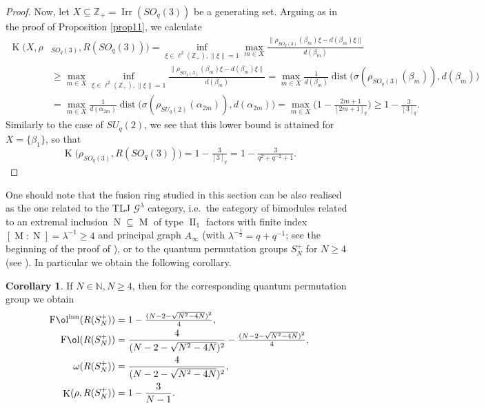 \documentclass[11 pt, leqno]{amsart}
\newcommand{\mc}{\mathcal}
\newcommand{\NN}{\mathbb{N}}
\newcommand{\ZZ}{\mathbb{Z}}
\newcommand{\oon}{\operatorname}
\DeclareMathOperator{\Fol}{F\mathrm{\o}l}
\DeclareMathOperator{\Folinn}{F\mathrm{\o}l^{inn}}
\DeclareMathOperator{\Kaz}{K}
\DeclareMathOperator{\Irr}{Irr}
\DeclareMathOperator{\M}{M}
\DeclareMathOperator{\N}{N}
\theoremstyle{definition}
\newtheorem{corollary}[theorem]{Corollary}
\numberwithin{equation}{section}
\begin{document}
\begin{proof}
Now, let $X\subseteq \ZZ_+=\Irr(SO_q(3))$ be a generating set. Arguing as in the proof of Proposition \ref{prop11}, we calculate
\begin{align*}
\Kaz\bigl(X,\rho&_{SO_q(3)},R(SO_q(3))\bigr)=
\inf_{\xi\in \ell^2(\ZZ_+), \|\xi\|=1}
\max_{m\in X} \tfrac{ \|\rho_{SO_q(3)}(\beta_m) \xi-d(\beta_m)\xi\|}{d(\beta_m)}\\
&\ge 
\max_{m\in X}\inf_{\xi\in \ell^2(\ZZ_+), \|\xi\|=1}\tfrac{ \|\rho_{SO_q(3)}(\beta_m) \xi-d(\beta_m)\xi\|}{d(\beta_m)}=
\max_{m\in X}\tfrac{1}{d(\beta_m)}
\oon{dist}\bigl( \sigma ( \rho_{SO_q(3)}(\beta_m) ), 
d(\beta_m)\bigr)\\
&=
\max_{m\in X}\tfrac{1}{d(\alpha_{2m})}
\oon{dist}\bigl( \sigma ( \rho_{SU_q(2)}(\alpha_{2m}) ), 
d(\alpha_{2m})\bigr)=
\max_{m\in X}
\bigl(1- \tfrac{2m+1}{[2m+1]_q}\bigr) \ge 1-\tfrac{3}{[3]_q}.
\end{align*}
Similarly to the case of $SU_q(2)$, we see that this lower bound is attained for $X=\{\beta_1\}$, so that
\[
\Kaz\bigl(\rho_{SO_q(3)},R(SO_q(3))\bigr)=
1-\tfrac{3}{[3]_q}=1-
\tfrac{3}{q^2+q^{-2}+1}.
\]
\end{proof}





One should note that the fusion ring studied in this section can be also realised as the one related to the TLJ $\mc{G}^{\lambda}$ category, i.e.\ the category of bimodules related to  an extremal inclusion  $\N\subseteq \M$ of type $\oon{II}_1$ factors with finite index $[\M\colon \N]=\lambda^{-1}\ge 4$ and principal graph $A_{\infty}$ (with $\lambda^{-\frac{1}{2}} = q+q^{-1}$; see the beginning of the proof of \cite[Theorem 7.1]{PopaVaes}), or to the quantum permutation groups $S_N^+$ for $N\geq 4$ (see \cite{BBC}). In particular we obtain the following corollary.





\begin{corollary} If $N\in \NN, N \geq 4$, then for the corresponding quantum permutation group we obtain
	\[\begin{split}
	\Folinn(R(S_N^+)) &= 1 - \tfrac{(N- 2 -\sqrt{N^2-4N})^{2}}{4} ,\\
	\Fol(R(S_N^+)) &= 
	\frac{4}{(N- 2 -\sqrt{N^2-4N})^{2}}
	- \tfrac{(N- 2 -\sqrt{N^2-4N})^{2}}{4}, \\
	\omega(R(S_N^+)) & = 	\frac{4}{(N- 2 -\sqrt{N^2-4N})^{2}}  , \\
	\Kaz(\rho,R(S_N^+)) & = 1- \frac{3}{N-1}. 
	\end{split}\]
\end{corollary}
\end{document}
